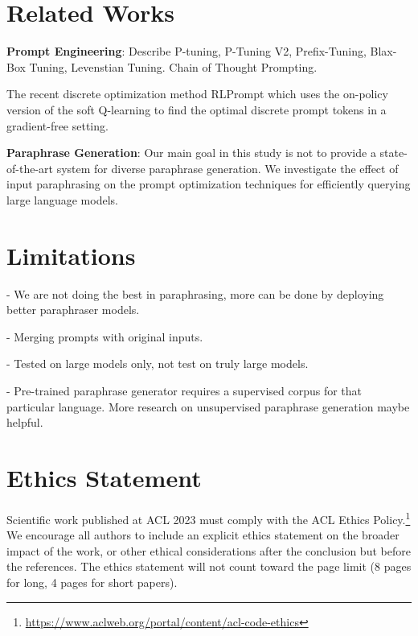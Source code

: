 \documentclass[11pt]{article}
\begin{document}
\begin{comment}
Table~\ref{citation-guide} shows the syntax supported by the style files.
We encourage you to use the natbib styles.
You can use the command \verb|\citet| (cite in text) to get ``author (year)'' citations, like this citation to a paper by \citet{Gusfield:97}.
You can use the command \verb|\citep| (cite in parentheses) to get ``(author, year)'' citations \citep{Gusfield:97}.
You can use the command \verb|\citealp| (alternative cite without parentheses) to get ``author, year'' citations, which is useful for using citations within parentheses (e.g. \citealp{Gusfield:97}).

\end{comment}

\section{Related Works}

\noindent
{\bf Prompt Engineering}:
Describe P-tuning, P-Tuning V2, Prefix-Tuning, Blax-Box Tuning, Levenstian Tuning. Chain of Thought Prompting.

The recent discrete optimization method RLPrompt \cite{deng-etal-2022-rlprompt} which uses the on-policy version of the soft Q-learning \cite{https://doi.org/10.48550/arxiv.2106.07704} to find the optimal discrete prompt tokens in a gradient-free setting.

\noindent
{\bf Paraphrase Generation}:
Our main goal in this study is not to provide a state-of-the-art system for diverse paraphrase generation. We investigate the effect of input paraphrasing on the prompt optimization techniques for efficiently querying large language models.

\section{Limitations}
- We are not doing the best in paraphrasing, more can be done by deploying better paraphraser models.

- Merging prompts with original inputs.

- Tested on large models only, not test on truly large models.

- Pre-trained paraphrase generator requires a supervised corpus for that particular language. More research on unsupervised paraphrase generation maybe helpful.

\section*{Ethics Statement}
Scientific work published at ACL 2023 must comply with the ACL Ethics Policy.\footnote{\url{https://www.aclweb.org/portal/content/acl-code-ethics}} We encourage all authors to include an explicit ethics statement on the broader impact of the work, or other ethical considerations after the conclusion but before the references. The ethics statement will not count toward the page limit (8 pages for long, 4 pages for short papers).
\end{document}
